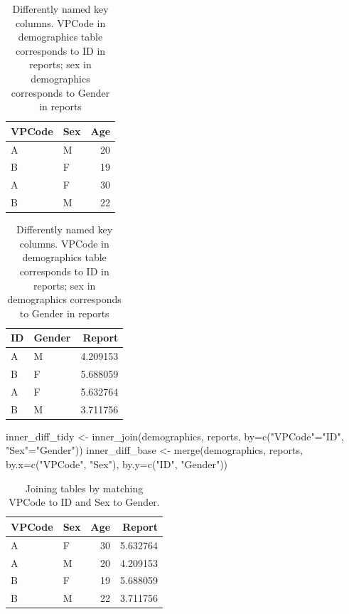\documentclass[
]{book}
\newenvironment{Shaded}{\begin{snugshade}}{\end{snugshade}}
\newcommand{\AttributeTok}[1]{\textcolor[rgb]{0.77,0.63,0.00}{#1}}
\newcommand{\FunctionTok}[1]{\textcolor[rgb]{0.00,0.00,0.00}{#1}}
\newcommand{\NormalTok}[1]{#1}
\newcommand{\OtherTok}[1]{\textcolor[rgb]{0.56,0.35,0.01}{#1}}
\newcommand{\StringTok}[1]{\textcolor[rgb]{0.31,0.60,0.02}{#1}}
\begin{document}
\begin{table}
\caption{\label{tab:unnamed-chunk-194}Differently named key columns. VPCode in demographics table corresponds to ID in reports; sex in demographics corresponds to Gender in reports}

\centering
\begin{tabular}[t]{l|l|r}
\hline
VPCode & Sex & Age\\
\hline
A & M & 20\\
\hline
B & F & 19\\
\hline
A & F & 30\\
\hline
B & M & 22\\
\hline
\end{tabular}
\centering
\begin{tabular}[t]{l|l|r}
\hline
ID & Gender & Report\\
\hline
A & M & 4.209153\\
\hline
B & F & 5.688059\\
\hline
A & F & 5.632764\\
\hline
B & M & 3.711756\\
\hline
\end{tabular}
\end{table}

\begin{Shaded}
\begin{Highlighting}[]
\NormalTok{inner\_diff\_tidy }\OtherTok{\textless{}{-}} \FunctionTok{inner\_join}\NormalTok{(demographics, reports, }\AttributeTok{by=}\FunctionTok{c}\NormalTok{(}\StringTok{"VPCode"}\OtherTok{=}\StringTok{"ID"}\NormalTok{, }\StringTok{"Sex"}\OtherTok{=}\StringTok{"Gender"}\NormalTok{))}
\NormalTok{inner\_diff\_base }\OtherTok{\textless{}{-}} \FunctionTok{merge}\NormalTok{(demographics, reports, }\AttributeTok{by.x=}\FunctionTok{c}\NormalTok{(}\StringTok{"VPCode"}\NormalTok{, }\StringTok{"Sex"}\NormalTok{), }\AttributeTok{by.y=}\FunctionTok{c}\NormalTok{(}\StringTok{"ID"}\NormalTok{, }\StringTok{"Gender"}\NormalTok{))}
\end{Highlighting}
\end{Shaded}

\begin{table}

\caption{\label{tab:unnamed-chunk-196}Joining tables by matching VPCode to ID and Sex to Gender.}
\centering
\begin{tabular}[t]{l|l|r|r}
\hline
VPCode & Sex & Age & Report\\
\hline
A & F & 30 & 5.632764\\
\hline
A & M & 20 & 4.209153\\
\hline
B & F & 19 & 5.688059\\
\hline
B & M & 22 & 3.711756\\
\hline
\end{tabular}
\end{table}
\end{document}
